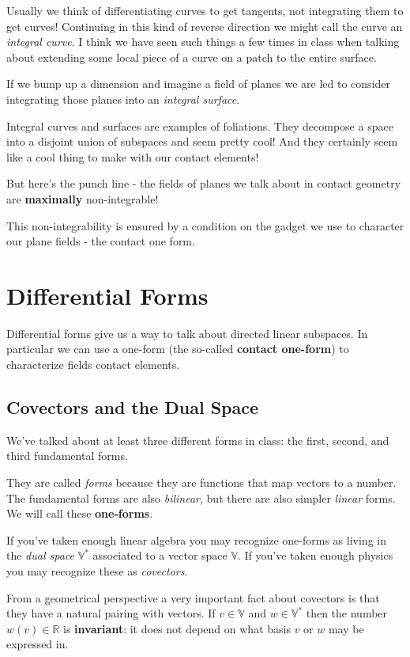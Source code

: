 \documentclass{article}
\begin{document}
Usually we think of differentiating curves to get tangents, not integrating them
to get curves! Continuing in this kind of reverse direction we might call the curve an
\textit{integral curve}. I think we have seen such things a few times in class when
talking about extending some local piece of a curve on a patch to the entire surface.

If we bump up a dimension and imagine a field of planes we are led to consider
integrating those planes into an \textit{integral surface}.

Integral curves and surfaces are examples of foliations. They decompose a space
into a disjoint union of subspaces and seem pretty cool! And they certainly seem
like a cool thing to make with our contact elements!

But here's the punch line - the fields of planes we talk about in contact
geometry are \textbf{maximally} non-integrable!

This non-integrability is ensured by a condition on the gadget we use to
character our plane fields - the contact one form.

\section {Differential Forms}

Differential forms give us a way to talk about directed linear subspaces. In
particular we can use a one-form (the so-called \textbf{contact one-form}) to
characterize fields contact elements.

\subsection{Covectors and the Dual Space}
We've talked about at least three different forms in class: the first, second,
and third fundamental forms.

They are called \textit{forms} because they are functions that map vectors to a
number. The fundamental forms are also \textit{bilinear}, but there are also simpler
\textit{linear} forms. We will call these \textbf{one-forms}.

If you've taken enough linear algebra you may recognize one-forms as living in
the \textit{dual space} $\mathbb{V}^{*}$ associated to a vector space
$\mathbb{V}$. If you've taken enough physics you may recognize these as \textit{covectors}.

From a geometrical perspective a very important fact about covectors is that
they have a natural pairing with vectors. If $v \in \mathbb{V}$ and $w \in \mathbb{V}^{*}$ then the number $w(v) \in
\mathbb{R}$ is \textbf{invariant}: it does not depend on what basis $v$ or $w$
may be expressed in.
\end{document}
